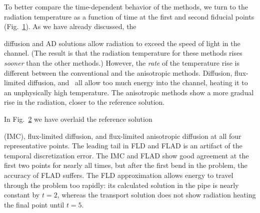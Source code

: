 \nonthesisclearpage

To better compare the time-dependent behavior of the methods, we turn to
the radiation temperature as a function of time at the first and second fiducial
points (Fig.~\ref{fig:doglegFiducial}). As we have already discussed, the
%
\begin{figure}[tb]
  \centering\small
  \subfloat[$x=0.9$, $y=1.0$]{%
    \hspace{-.25in}%
    
  }%
  \subfloat[$x=0.9$, $y=0.3$]{%
    \hspace{-.25in}%
    
  }%
  \label{fig:doglegFiducial}
\end{figure}
%
diffusion and AD solutions allow radiation to exceed the speed of light in the
channel. (The result is that the radiation temperature for these methods rises
\emph{sooner} than the other methods.) However, the \emph{rate} of
the temperature rise is different between the conventional and the anisotropic
methods. Diffusion, flux-limited diffusion, and \Pone\ all allow too much energy
into the channel, heating it to an unphysically high temperature. The
anisotropic methods show a more gradual rise in the radiation, closer to the
reference solution.

In Fig.~\ref{fig:doglegFiducialAll} we have overlaid the reference solution
%
\begin{figure}[htb]
  \centering\small
  \hspace{-.25in}%
  
  \label{fig:doglegFiducialAll}
\end{figure}
%
(IMC), flux-limited diffusion, and flux-limited anisotropic diffusion at all
four representative points. The leading tail in FLD and FLAD is an artifact of
the temporal discretization error. The IMC and FLAD show good agreement at the
first two points for nearly all times, but after the first bend in the problem,
the accuracy of FLAD suffers. The FLD approximation allows energy to travel
through the problem too rapidly: its calculated solution in the pipe is
nearly constant by $t=2$, whereas the transport solution does not show radiation
heating the final point until $t=5$.

